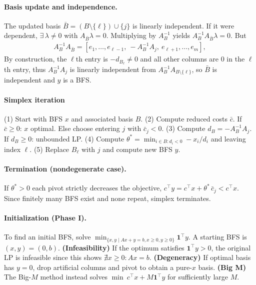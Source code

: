 \documentclass{article}
\begin{document}
\paragraph{Basis update and independence.}
The updated basis $\bar B = (B\setminus\{\ell\})\cup\{j\}$ is linearly independent.
If it were dependent, $\exists\,\lambda\neq0$ with $A_{\bar B}\lambda=0$.
Multiplying by $A_B^{-1}$ yields $A_B^{-1}A_{\bar B}\lambda=0$.
But
\begin{align*}
A_B^{-1}A_{\bar B} = 
[e_1,\dots,e_{\ell-1},\ -A_B^{-1}A_j,\ e_{\ell+1},\dots,e_m],
\end{align*}
By construction, the $\ell$th entry is $-d_{B_\ell} \neq 0$ and all other columns are 0 in the $\ell$th entry, thus $A_B^{-1}A_j$ is linearly independent from $A_B^{-1}A_{B\setminus\{\ell\}}$, so $\bar B$ is independent and $y$ is a BFS.

\paragraph{Simplex iteration} 
(1) Start with BFS $x$ and associated basis $B$. 
(2) Compute reduced costs $\bar c$. If $\bar c\ge0$: $x$ optimal. Else choose entering $j$ with $\bar c_j<0$.
(3) Compute $d_B = -A_B^{-1}A_j$. If $d_B\ge0$: unbounded LP.
(4) Compute $\theta^* = \min_{i\in B: d_i<0} -x_i/d_i$ and leaving index $\ell$.
(5) Replace $B_\ell$ with $j$ and compute new BFS $y$.

\paragraph{Termination (nondegenerate case).}
If $\theta^*>0$ each pivot strictly decreases the objective, $c^\top y = c^\top x + \theta^*\,\bar c_j < c^\top x$.
Since finitely many BFS exist and none repeat, simplex terminates.


\paragraph{Initialization (Phase I).}
To find an initial BFS, solve 
$\min_{\{x, y \mid Ax + y = b, x\geq 0, y \geq 0\}} \mathbf{1}^\top y$.
A starting BFS is $(x,y)=(0,b)$.
\textbf{(Infeasibility)} If the optimum satisfies $\mathbf{1}^\top y>0$, the original LP is infeasible since this shows $\nexists x \geq 0 : Ax = b$.
\textbf{(Degeneracy)} If optimal basis has $y=0$, drop artificial columns and pivot to obtain a pure-$x$ basis.
\textbf{(Big M)} The Big-$M$ method instead solves $\min\ c^\top x + M\mathbf{1}^\top y$ for sufficiently large $M$.
\end{document}
